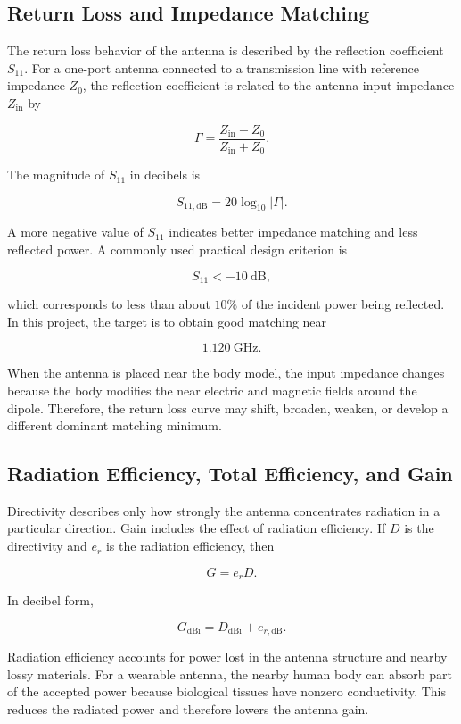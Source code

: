 \subsection{Return Loss and Impedance Matching}

The return loss behavior of the antenna is described by the reflection coefficient \(S_{11}\). For a one-port antenna connected to a transmission line with reference impedance \(Z_0\), the reflection coefficient is related to the antenna input impedance \(Z_{\mathrm{in}}\) by

\[
\Gamma =
\frac{Z_{\mathrm{in}} - Z_0}
     {Z_{\mathrm{in}} + Z_0}.
\]

The magnitude of \(S_{11}\) in decibels is

\[
S_{11,\mathrm{dB}} = 20\log_{10}|\Gamma|.
\]

A more negative value of \(S_{11}\) indicates better impedance matching and less reflected power. A commonly used practical design criterion is

\[
S_{11} < -10~\mathrm{dB},
\]

which corresponds to less than about \(10\%\) of the incident power being reflected. In this project, the target is to obtain good matching near

\[
1.120~\mathrm{GHz}.
\]

When the antenna is placed near the body model, the input impedance changes because the body modifies the near electric and magnetic fields around the dipole. Therefore, the return loss curve may shift, broaden, weaken, or develop a different dominant matching minimum.

\subsection{Radiation Efficiency, Total Efficiency, and Gain}

Directivity describes only how strongly the antenna concentrates radiation in a particular direction. Gain includes the effect of radiation efficiency. If \(D\) is the directivity and \(e_r\) is the radiation efficiency, then

\[
G = e_r D.
\]

In decibel form,

\[
G_{\mathrm{dBi}} =
D_{\mathrm{dBi}} + e_{r,\mathrm{dB}}.
\]

Radiation efficiency accounts for power lost in the antenna structure and nearby lossy materials. For a wearable antenna, the nearby human body can absorb part of the accepted power because biological tissues have nonzero conductivity. This reduces the radiated power and therefore lowers the antenna gain.

